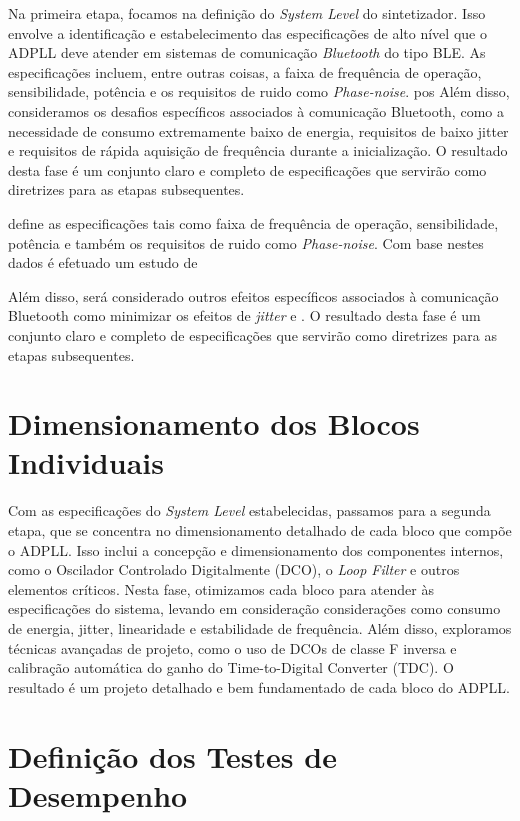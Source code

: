 Na primeira etapa, focamos na definição do \textit{System Level} do sintetizador. Isso envolve a identificação e estabelecimento das especificações de alto nível que o ADPLL deve atender em sistemas de comunicação \textit{Bluetooth} do tipo BLE.  As especificações incluem, entre outras coisas, a faixa de frequência de operação, sensibilidade, potência e os requisitos de ruido como \textit{Phase-noise}. \cite{BluetoothSite} pos
Além disso, consideramos os desafios específicos associados à comunicação Bluetooth, como a necessidade de consumo extremamente baixo de energia, requisitos de baixo jitter e requisitos de rápida aquisição de frequência durante a inicialização. O resultado desta fase é um conjunto claro e completo de especificações que servirão como diretrizes para as etapas subsequentes.

\cite{BluetoothSite} define as especificações tais como faixa de frequência de operação, sensibilidade, potência e também os requisitos de ruido como \textit{Phase-noise}. Com base nestes dados é efetuado um estudo de 

Além disso, será considerado outros efeitos específicos associados à comunicação Bluetooth como minimizar os efeitos  de \textit{jitter} e . O resultado desta fase é um conjunto claro e completo de especificações que servirão como diretrizes para as etapas subsequentes.

\section{Dimensionamento dos Blocos Individuais}

Com as especificações do \textit{System Level} estabelecidas, passamos para a segunda etapa, que se concentra no dimensionamento detalhado de cada bloco que compõe o ADPLL. Isso inclui a concepção e dimensionamento dos componentes internos, como o Oscilador Controlado Digitalmente (DCO), o \textit{Loop Filter} e outros elementos críticos. Nesta fase, otimizamos cada bloco para atender às especificações do sistema, levando em consideração considerações como consumo de energia, jitter, linearidade e estabilidade de frequência. Além disso, exploramos técnicas avançadas de projeto, como o uso de DCOs de classe F inversa e calibração automática do ganho do Time-to-Digital Converter (TDC). O resultado é um projeto detalhado e bem fundamentado de cada bloco do ADPLL.

\section{Definição dos Testes de Desempenho}


